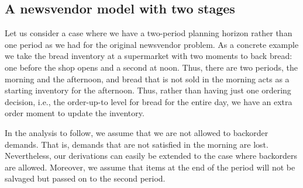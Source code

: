 \subsection{A newsvendor model with two stages}

Let us consider a case where we have a two-period planning horizon rather than one period as we had for the original newsvendor problem. As a concrete example we take the bread inventory at a supermarket with two moments to back bread: one before the shop opens and a second at noon. Thus, there are two periods, the morning and the afternoon, and bread that is not sold in the morning acts as a starting inventory for the afternoon. Thus, rather than having just one ordering decision, i.e., the order-up-to level for bread for the entire day, we have an extra order moment to update the inventory. 


In the analysis to follow, we assume that we are not allowed to backorder demands. That is, demands that are not satisfied in the morning are lost. Nevertheless, our derivations can easily be extended to the case where backorders are allowed.  Moreover, we assume that items at the end of the period will not be salvaged but passed on to the second period.

